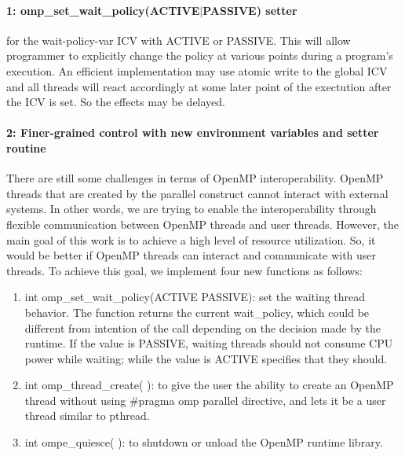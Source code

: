 \paragraph{1: {\sf omp\_set\_wait\_policy(ACTIVE$\vert$PASSIVE)} setter} for the wait-policy-var
ICV with ACTIVE or PASSIVE. This will allow programmer to explicitly change the policy at various 
points during a program's execution. An efficient implementation may use atomic write to the 
global ICV and all threads will react accordingly at some later point of the exectution after the 
ICV is set. So the effects may be delayed.

\paragraph{2: Finer-grained control with new environment variables and setter routine}



There are still some challenges in terms of OpenMP interoperability. 
OpenMP threads that are created by the parallel construct cannot interact with external systems. 
In other words, we are trying to enable the interoperability through flexible communication between OpenMP threads and user threads. 
However, the main goal of this work is to achieve a high level of resource utilization. So, it would be better if OpenMP threads can interact and communicate with user threads. To achieve this goal, we implement four new functions as follows:
\begin{enumerate}
	\item int omp{\_}set{\_}wait{\_}policy(ACTIVE \textbar PASSIVE): 
	set the waiting thread behavior. The function returns the current wait{\_}policy, which could be different from intention of the call depending on the decision made by the runtime. If the value is PASSIVE, waiting threads should not consume CPU power while waiting; while the value is ACTIVE specifies that they should.
	\item int omp{\_}thread{\_}create( ): 
	to give the user the ability to create an OpenMP thread without using \#pragma omp parallel directive, and lets it be a user thread similar to pthread.
	\item int ompe{\_}quiesce( ): 
	to shutdown or unload the OpenMP runtime library.
\end{enumerate}
